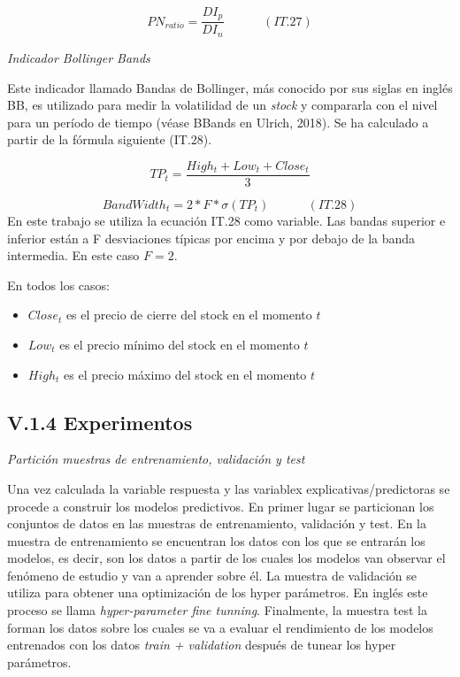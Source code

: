 \documentclass[]{DissertateUSU}
\begin{document}
\[PN_{ratio}=\frac{DI_p}{DI_n} \ \ \ \ \ \ \ \ \ \ \ \ \ \ (IT.27)\]

\emph{Indicador Bollinger Bands}

\noindent Este indicador llamado Bandas de Bollinger, más conocido por
sus siglas en inglés BB, es utilizado para medir la volatilidad de un
\emph{stock} y compararla con el nivel para un período de tiempo (véase
BBands en Ulrich, 2018). Se ha calculado a partir de la fórmula
siguiente (IT.28).

\[TP_t=\frac{High_t+Low_t+Close_t}{3}\]

\[BandWidth_t = 2*F *σ(T P_t) \ \ \ \ \ \ \ \ \ \ \ \ \ \ (IT.28)\]
\noindent En este trabajo se utiliza la ecuación IT.28 como variable.
Las bandas superior e inferior están a F desviaciones típicas por encima
y por debajo de la banda intermedia. En este caso \(F=2\).

\noindent En todos los casos:

\begin{itemize}
\item
  \(Close_t\) es el precio de cierre del stock en el momento \(t\)
\item
  \(Low_t\) es el precio mínimo del stock en el momento \(t\)
\item
  \(High_t\) es el precio máximo del stock en el momento \(t\)
\end{itemize}

\justifying

\FloatBarrier
{}
\fancyfoot[C]{\thepage}

\subsection{V.1.4 \textbf{Experimentos}}

\justifying

\emph{Partición muestras de entrenamiento, validación y test}

\noindent Una vez calculada la variable respuesta y las variablex
explicativas/predictoras se procede a construir los modelos predictivos.
En primer lugar se particionan los conjuntos de datos en las muestras de
entrenamiento, validación y test. En la muestra de entrenamiento se
encuentran los datos con los que se entrarán los modelos, es decir, son
los datos a partir de los cuales los modelos van observar el fenómeno de
estudio y van a aprender sobre él. La muestra de validación se utiliza
para obtener una optimización de los hyper parámetros. En inglés este
proceso se llama \emph{hyper-parameter fine tunning}. Finalmente, la
muestra test la forman los datos sobre los cuales se va a evaluar el
rendimiento de los modelos entrenados con los datos \emph{train +
validation} después de tunear los hyper parámetros.
\end{document}
